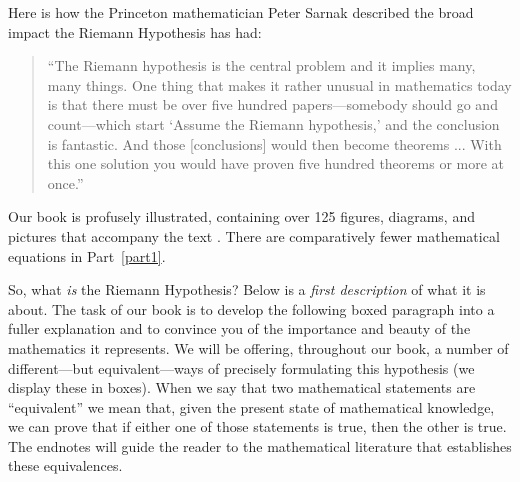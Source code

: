 \documentclass[openany]{book}
\theoremstyle{plain}
\theoremstyle{definition}
\begin{document}
Here is how the
Princeton mathematician Peter Sarnak described the broad impact the
Riemann Hypothesis has had:
\begin{quote}
``The Riemann hypothesis is the central problem and it implies many,
many things. One thing that makes it rather unusual in mathematics
today is that there must be over five hundred papers---somebody should
go and count---which start `Assume the Riemann hypothesis,' and
the conclusion is fantastic. And those [conclusions] would then become
theorems ... With this one solution you would have proven five hundred
theorems or more at once.'' 
\end{quote}


Our book is profusely illustrated, containing over 125 figures,
diagrams, and pictures that accompany the text .
There are comparatively fewer
mathematical equations in Part~\ref{part1}.

So, what {\it is} the Riemann Hypothesis?  Below is a {\it first
  description} of what it is about. The task of our book is to develop
the following boxed paragraph into a fuller explanation and to
convince you of the importance and beauty of the mathematics it
represents.  We will be offering, throughout our book, a number of
different---but equivalent---ways of precisely formulating this
hypothesis (we display these in boxes).  When we say that two
mathematical statements are ``equivalent'' we mean that, given the
present state of mathematical knowledge, we can prove that if either
one of those statements is true, then the other is true. The endnotes
will guide the reader to the mathematical literature that establishes
these equivalences.
\end{document}
